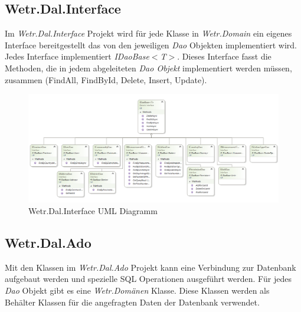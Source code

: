 \newpage
\subsection{Wetr.Dal.Interface}
Im \textit{Wetr.Dal.Interface} Projekt wird für jede Klasse in  \textit{Wetr.Domain} ein eigenes Interface bereitgestellt das von den jeweiligen \textit{Dao} Objekten implementiert wird. Jedes Interface implementiert \textit{IDaoBase}$<$\textit{T}$>$. Dieses Interface fasst die Methoden, die in jedem abgeleiteten \textit{Dao Objekt} implementiert werden müssen, zusammen (FindAll, FindById, Delete, Insert, Update).

\begin{figure}[H]
\centering
\includegraphics[width=\textwidth]{pictures/Wetr_Dal_Interface.png}
\caption{Wetr.Dal.Interface UML Diagramm}
\label{fig:Wetr.Dal.Interface}
\end{figure}
\raggedright

\newpage
\subsection{Wetr.Dal.Ado}
Mit den Klassen im \textit{Wetr.Dal.Ado} Projekt kann eine Verbindung zur Datenbank aufgebaut werden und spezielle SQL Operationen ausgeführt werden. Für jedes \textit{Dao} Objekt gibt es eine \textit{Wetr.Domänen} Klasse. Diese Klassen werden als Behälter Klassen für die angefragten Daten der Datenbank verwendet.

